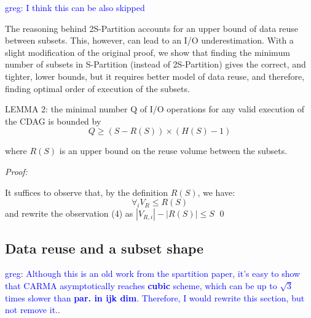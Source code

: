 \documentclass[sigconf]{acmart}
\newcommand\greg[1]{\textcolor{blue}{greg: #1}}
\begin{document}
\greg{I think this can be also skipped}

The reasoning behind 2S-Partition accounts for an upper bound of data 
reuse 
between subsets.
This, however, can lead to an I/O underestimation. With a slight modification 
of 
the original proof, we show that finding the minimum number of subsets in 
S-Partition 
(instead of 
2S-Partition) gives the correct, and tighter, lower bounds, but it 
requires better model of data reuse, and therefore, finding optimal order 
of execution of the subsets.

LEMMA 2:
the minimal number Q of I/O operations for any valid execution of the CDAG 
is bounded by	
\begin{equation}
Q \ge (S - R(S)) \times (H(S) - 1)
	\label{eq:reusebound}
\end{equation}

where $R(S)$ is an upper bound on the reuse volume between the subsets.

\textit{Proof:}

It suffices to observe that, by the definition $R(S)$, we have:
$$\forall_{i} V_{R} \le R(S)$$
and rewrite the observation (4) as $|V_{R,i}| - |R(S)| \le S$ \qed


%	
%	
\subsection{Data reuse and a subset shape}
\label{sec:partitionShape}

\greg{Although this is an old work from the spartition paper, it's easy to show 
that CARMA asymptotically reaches \textbf{cubic} scheme, which can be up to 
$\sqrt{3}$ times slower than \textbf{par. in ijk dim}. Therefore, I would 
rewrite 
this section, but not remove it.}.
\end{document}
